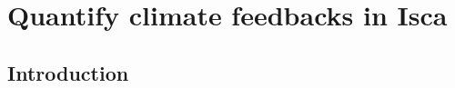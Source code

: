 


\section{Quantify climate feedbacks in Isca}
\label{sec:method_radiative_kernel}

\subsection{Introduction}

